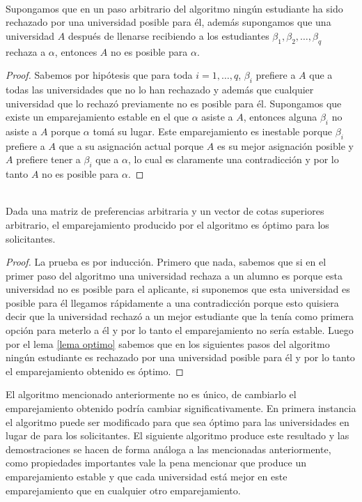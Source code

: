 \begin{lem} 
\label{lema optimo} 
\cite{GaleShapley} \\
Supongamos que en un paso arbitrario del algoritmo ningún estudiante ha sido rechazado por una universidad posible para él, además supongamos que una universidad $A$ después de llenarse recibiendo a los estudiantes $\beta_1,\beta_2,\dots,\beta_q$ rechaza a $\alpha$, entonces $A$ no es posible para $\alpha$.
\end{lem}
\begin{proof}
Sabemos por hipótesis que para toda $i=1,\dots,q$, $\beta_i$ prefiere a $A$ que a todas las universidades que no lo han rechazado y además que cualquier universidad que lo rechazó previamente no es posible para él. Supongamos que existe un emparejamiento estable en el que $\alpha$ asiste a $A$, entonces alguna $\beta_i$ no asiste a $A$ porque $\alpha$ tomá su lugar. Este emparejamiento es inestable porque $\beta_i$ prefiere a $A$ que a su asignación actual porque $A$ es su mejor asignación posible y $A$ prefiere tener a $\beta_i$ que a $\alpha$, lo cual es claramente una contradicción y por lo tanto $A$ no es posible para $\alpha$.
\end{proof}

\begin{teo}
\label{optimo}
\cite{GaleShapley} \\
Dada una matriz de preferencias arbitraria y un vector de cotas superiores arbitrario, el emparejamiento producido por el algoritmo es óptimo para los solicitantes.
\end{teo}
\begin{proof}
La prueba es por inducción. Primero que nada, sabemos que si en el primer paso del algoritmo una universidad rechaza a un alumno es porque esta universidad no es posible para el aplicante, si suponemos que esta universidad es posible para él llegamos rápidamente a una contradicción porque esto quisiera decir que la universidad rechazó a un mejor estudiante que la tenía como primera opción para meterlo a él y por lo tanto el emparejamiento no sería estable. Luego por el lema \ref{lema optimo} sabemos que en los siguientes pasos del algoritmo ningún estudiante es rechazado por una universidad posible para él y por lo tanto el emparejamiento obtenido es óptimo. 
\end{proof}

El algoritmo mencionado anteriormente no es único, de cambiarlo el emparejamiento obtenido podría cambiar significativamente. En primera instancia el algoritmo puede ser modificado para que sea óptimo para las universidades en lugar de para los solicitantes. El siguiente algoritmo produce este resultado y las demostraciones se hacen de forma análoga a las mencionadas anteriormente, como propiedades importantes vale la pena mencionar que produce un emparejamiento estable y que cada universidad está mejor en este emparejamiento que en cualquier otro emparejamiento. 

